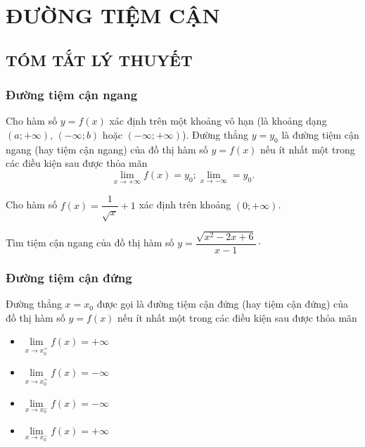 \section{ĐƯỜNG TIỆM CẬN}
\subsection{TÓM TẮT LÝ THUYẾT}
\subsubsection{Đường tiệm cận ngang}
\begin{dn}
Cho hàm số $y=f(x)$ xác định trên một khoảng vô hạn (là khoảng dạng $(a;+\infty)$, $(-\infty;b)$ hoặc $(-\infty;+\infty)$). Đường thẳng $y=y_0$ là đường tiệm cận ngang (hay tiệm cận ngang) của đồ thị hàm số $y=f(x)$ nếu ít nhất một trong các điều kiện sau được thỏa mãn
$$\lim\limits_{x\to +\infty}f(x)=y_0; \lim\limits_{x\to -\infty} =y_0.$$
\end{dn}

\begin{vd}%
Cho hàm số $f(x)=\dfrac{1}{\sqrt{x}}+1$ xác định trên khoảng $(0;+\infty)$. 
\end{vd}

\begin{vd}%
Tìm tiệm cận ngang của đồ thị hàm số $y=\dfrac{\sqrt{x^2-2x+6}}{x-1}\cdot$
\end{vd}

\subsubsection{Đường tiệm cận đứng}
\begin{dn}
Đường thẳng $x=x_0$ được gọi là đường tiệm cận đứng (hay tiệm cận đứng) của đồ thị hàm số $y=f(x)$ nếu ít nhất một trong các điều kiện sau được thỏa mãn
\begin{multicols}{2}
\begin{itemize}
	\item $\lim\limits_{x\to x_0^+} f(x)=+\infty$
	\item $\lim\limits_{x\to x_0^+} f(x)=-\infty$
	\item $\lim\limits_{x\to x_0^-} f(x)=-\infty$
	\item $\lim\limits_{x\to x_0^-} f(x)=+\infty$
\end{itemize}
\end{multicols}
\end{dn}

